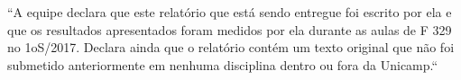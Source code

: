 ``A equipe declara que este relatório que está sendo entregue foi escrito por ela e
que os resultados apresentados foram medidos por ela durante as aulas de F 329 no
1oS/2017. Declara ainda que o relatório contém um texto original que não foi submetido
anteriormente em nenhuma disciplina dentro ou fora da Unicamp.``